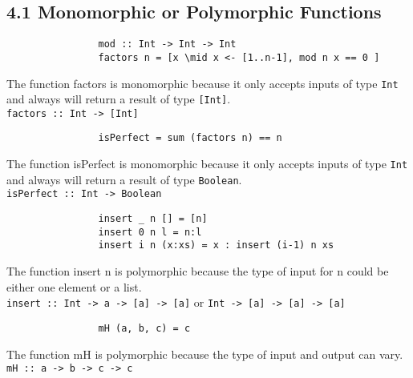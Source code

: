 \documentclass{article}
\begin{document}
	\pagestyle{fancy}
	\hfill
	
	\subsection*{4.1 Monomorphic or Polymorphic Functions}
	\begin{adjustwidth}{2em}{2em}
		\begin{tcolorbox}
			\begin{verbatim}
				mod :: Int -> Int -> Int
				factors n = [x \mid x <- [1..n-1], mod n x == 0 ]
			\end{verbatim}
		\end{tcolorbox}
		\noindent The function factors is monomorphic because it only accepts inputs of type \texttt{Int} and always will return a result of type \texttt{[Int]}. \\
		\texttt{factors :: Int -> [Int]} \\
		\begin{tcolorbox}
			\begin{verbatim}
				isPerfect = sum (factors n) == n
			\end{verbatim}
		\end{tcolorbox}
		\noindent The function isPerfect is monomorphic because it only accepts inputs of type \texttt{Int} and always will return a result of type \texttt{Boolean}. \\
		\texttt{isPerfect :: Int -> Boolean}
		\begin{tcolorbox}
			\begin{verbatim}
				insert _ n [] = [n]
				insert 0 n l = n:l
				insert i n (x:xs) = x : insert (i-1) n xs
			\end{verbatim}
		\end{tcolorbox}
		\noindent The function insert n is polymorphic because the type of input for n could be either one element or a list. \\
		\texttt{insert :: Int -> a -> [a] -> [a]} or \texttt{Int -> [a] -> [a] -> [a]} \\
		\begin{tcolorbox}
			\begin{verbatim}
				mH (a, b, c) = c
			\end{verbatim}
		\end{tcolorbox}
		\noindent The function mH is polymorphic because the type of input and output can vary. \\
		\texttt{mH :: a -> b -> c -> c}
	\end{adjustwidth}
	
\end{document}
